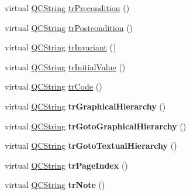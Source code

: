 \begin{DoxyCompactItemize}
\item 
virtual \mbox{\hyperlink{class_q_c_string}{Q\+C\+String}} \mbox{\hyperlink{class_translator_chinesetraditional_a938da32ab20e86e35800dc3782a87412}{tr\+Precondition}} ()
\item 
virtual \mbox{\hyperlink{class_q_c_string}{Q\+C\+String}} \mbox{\hyperlink{class_translator_chinesetraditional_a6d6cb27072cc8f39c0013e0d43f745ae}{tr\+Postcondition}} ()
\item 
virtual \mbox{\hyperlink{class_q_c_string}{Q\+C\+String}} \mbox{\hyperlink{class_translator_chinesetraditional_a895236a1e7edd69286c8e068f4a3037c}{tr\+Invariant}} ()
\item 
virtual \mbox{\hyperlink{class_q_c_string}{Q\+C\+String}} \mbox{\hyperlink{class_translator_chinesetraditional_ad818eb8e6c599cea1267baf01a118ce9}{tr\+Initial\+Value}} ()
\item 
virtual \mbox{\hyperlink{class_q_c_string}{Q\+C\+String}} \mbox{\hyperlink{class_translator_chinesetraditional_a1e982f83fc7265c533b8d361b97c4a1a}{tr\+Code}} ()
\item 
\mbox{\label{class_translator_chinesetraditional_a785c89b9c9e46df0fb240582cce8b50e}} 
virtual \mbox{\hyperlink{class_q_c_string}{Q\+C\+String}} {\bfseries tr\+Graphical\+Hierarchy} ()
\item 
\mbox{\label{class_translator_chinesetraditional_ab5092526b1326b9266d4c0d574bb1fed}} 
virtual \mbox{\hyperlink{class_q_c_string}{Q\+C\+String}} {\bfseries tr\+Goto\+Graphical\+Hierarchy} ()
\item 
\mbox{\label{class_translator_chinesetraditional_a3cf669a7be42d22e620127f098443fa8}} 
virtual \mbox{\hyperlink{class_q_c_string}{Q\+C\+String}} {\bfseries tr\+Goto\+Textual\+Hierarchy} ()
\item 
\mbox{\label{class_translator_chinesetraditional_a69b846809e1de89c78d5dca6d0ef753b}} 
virtual \mbox{\hyperlink{class_q_c_string}{Q\+C\+String}} {\bfseries tr\+Page\+Index} ()
\item 
\mbox{\label{class_translator_chinesetraditional_a7e75e3258e819801427e68a79a65d5a7}} 
virtual \mbox{\hyperlink{class_q_c_string}{Q\+C\+String}} {\bfseries tr\+Note} ()

\end{DoxyCompactItemize}
